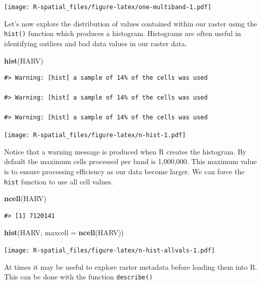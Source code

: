 \documentclass[
]{book}
\newenvironment{Shaded}{\begin{snugshade}}{\end{snugshade}}
\newcommand{\AttributeTok}[1]{\textcolor[rgb]{0.13,0.29,0.53}{#1}}
\newcommand{\FunctionTok}[1]{\textcolor[rgb]{0.13,0.29,0.53}{\textbf{#1}}}
\newcommand{\NormalTok}[1]{#1}
\begin{document}
\texttt{[image: R-spatial\_files/figure-latex/one-multiband-1.pdf]}

Let's now explore the distribution of values contained within our raster using the \texttt{hist()} function which produces a histogram. Histograms are often useful in identifying outliers and bad data values in our raster data.

\begin{Shaded}
\begin{Highlighting}[]
\FunctionTok{hist}\NormalTok{(HARV)}
\end{Highlighting}
\end{Shaded}

\begin{verbatim}
#> Warning: [hist] a sample of 14% of the cells was used

#> Warning: [hist] a sample of 14% of the cells was used

#> Warning: [hist] a sample of 14% of the cells was used
\end{verbatim}

\texttt{[image: R-spatial\_files/figure-latex/n-hist-1.pdf]}

Notice that a warning message is produced when R creates the histogram. By default the maximum cells processed per band is 1,000,000. This maximum value is to ensure processing efficiency as our data become larger. We can force the \texttt{hist} function to use all cell values.

\begin{Shaded}
\begin{Highlighting}[]
\FunctionTok{ncell}\NormalTok{(HARV)}
\end{Highlighting}
\end{Shaded}

\begin{verbatim}
#> [1] 7120141
\end{verbatim}

\begin{Shaded}
\begin{Highlighting}[]
\FunctionTok{hist}\NormalTok{(HARV, }\AttributeTok{maxcell =} \FunctionTok{ncell}\NormalTok{(HARV))}
\end{Highlighting}
\end{Shaded}

\texttt{[image: R-spatial\_files/figure-latex/n-hist-allvals-1.pdf]}

At times it may be useful to explore raster metadata before loading them into R. This can be done with the function \texttt{describe()}
\end{document}
